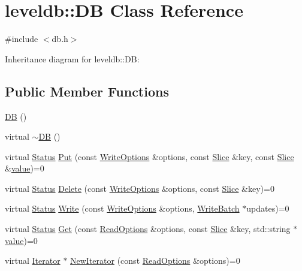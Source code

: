 \hypertarget{classleveldb_1_1_d_b}{}\section{leveldb\+:\+:D\+B Class Reference}
\label{classleveldb_1_1_d_b}


{\ttfamily \#include $<$db.\+h$>$}



Inheritance diagram for leveldb\+:\+:D\+B\+:
\subsection*{Public Member Functions}
\begin{DoxyCompactItemize}
\item 
\hyperlink{classleveldb_1_1_d_b_a6b275339ff6194c598daf7091ad8d5c1}{D\+B} ()
\item 
virtual \hyperlink{classleveldb_1_1_d_b_a15f516eb9ec41812419a7160b4740a22}{$\sim$\+D\+B} ()
\item 
virtual \hyperlink{classleveldb_1_1_status}{Status} \hyperlink{classleveldb_1_1_d_b_ac2e472812630ed74298df7b03b08c1ae}{Put} (const \hyperlink{structleveldb_1_1_write_options}{Write\+Options} \&options, const \hyperlink{classleveldb_1_1_slice}{Slice} \&key, const \hyperlink{classleveldb_1_1_slice}{Slice} \&\hyperlink{cache_8cc_a0f61d63b009d0880a89c843bd50d8d76}{value})=0
\item 
virtual \hyperlink{classleveldb_1_1_status}{Status} \hyperlink{classleveldb_1_1_d_b_aff7577239799cd059464701c548090b9}{Delete} (const \hyperlink{structleveldb_1_1_write_options}{Write\+Options} \&options, const \hyperlink{classleveldb_1_1_slice}{Slice} \&key)=0
\item 
virtual \hyperlink{classleveldb_1_1_status}{Status} \hyperlink{classleveldb_1_1_d_b_ae0b6ded8c8e0b88ff70190bf7a0c086c}{Write} (const \hyperlink{structleveldb_1_1_write_options}{Write\+Options} \&options, \hyperlink{classleveldb_1_1_write_batch}{Write\+Batch} $\ast$updates)=0
\item 
virtual \hyperlink{classleveldb_1_1_status}{Status} \hyperlink{classleveldb_1_1_d_b_ad43bd7937b9af88ff856eb8158890911}{Get} (const \hyperlink{structleveldb_1_1_read_options}{Read\+Options} \&options, const \hyperlink{classleveldb_1_1_slice}{Slice} \&key, std\+::string $\ast$\hyperlink{cache_8cc_a0f61d63b009d0880a89c843bd50d8d76}{value})=0
\item 
virtual \hyperlink{classleveldb_1_1_iterator}{Iterator} $\ast$ \hyperlink{classleveldb_1_1_d_b_a5629308235de24c05c286c353d4e7d32}{New\+Iterator} (const \hyperlink{structleveldb_1_1_read_options}{Read\+Options} \&options)=0

\end{DoxyCompactItemize}

